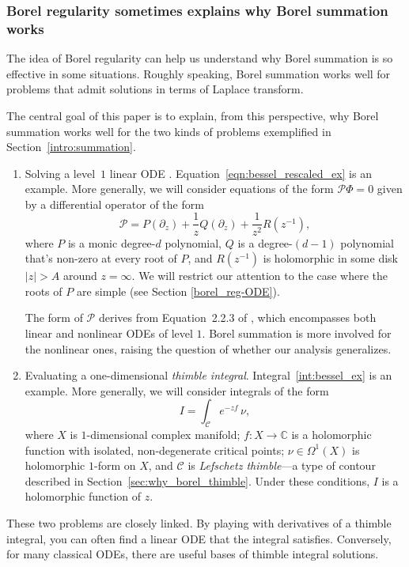 \documentclass{article}
\newcommand{\maps}{\colon}
\newcommand{\C}{\mathbb{C}}
\theoremstyle{definition}
\theoremstyle{plain}
\begin{document}
\subsubsection{Borel regularity sometimes explains why Borel summation works}\label{borel-reg:explanatory-power}
The idea of Borel regularity can help us understand why Borel summation is so effective in some situations. Roughly speaking, Borel summation works well for problems that admit solutions in terms of Laplace transform. 

The central goal of this paper is to explain, from this perspective, why Borel summation works well for the two kinds of problems exemplified in Section~\ref{intro:summation}.
\begin{enumerate}
\item Solving a level~$1$ linear ODE \cite[Section 2.1]{EcalleIII}\cite[Section~5.2.2.1]{diverg-resurg-iii}. Equation~\eqref{eqn:bessel_rescaled_ex} is an example. More generally, we will consider equations of the form $\mathcal{P} \Phi = 0$ given by a differential operator of the form
\[ \mathcal{P} = P(\partial_z) + \frac{1}{z} Q(\partial_z) + \frac{1}{z^2} R(z^{-1}), \]
where $P$ is a monic degree-$d$ polynomial, $Q$ is a degree-$(d-1)$ polynomial that's non-zero at every root of $P$, and $R(z^{-1})$ is holomorphic in some disk $|z| > A$ around $z = \infty$. We will restrict our attention to the case where the roots of $P$ are simple (see Section \ref{borel_reg-ODE}).

The form of $\mathcal{P}$ derives from Equation~2.2.3 of \cite[pag. 105]{EcalleIII}, which encompasses both linear and nonlinear ODEs of level $1$. Borel summation is more involved for the nonlinear ones, raising the question of whether our analysis generalizes.
%
\item Evaluating a one-dimensional {\em thimble integral}. Integral~\eqref{int:bessel_ex} is an example. More generally, we will consider integrals of the form
\begin{equation*}
I = \int_{\mathcal{C}}e^{-zf}\,\nu,
\end{equation*}
where $X$ is $1$-dimensional complex manifold; $f \maps X \to \C$ is a holomorphic function with isolated, non-degenerate critical points; $\nu \in \Omega^1(X)$ is holomorphic $1$-form on $X$, and $\mathcal{C}$ is {\em Lefschetz thimble}---a type of contour described in Section~\ref{sec:why_borel_thimble}. Under these conditions, $I$ is a holomorphic function of $z$.
\end{enumerate}
These two problems are closely linked. By playing with derivatives of a thimble integral, you can often find a linear ODE that the integral satisfies. Conversely, for many classical ODEs, there are useful bases of thimble integral solutions.
\end{document}
